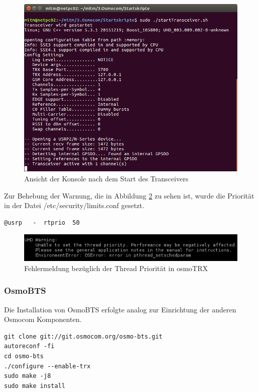 \begin{figure}[h] %
\centering
\includegraphics[width=15cm]{includes/Start_Transceiver}
\caption{Ansicht der Konsole nach dem Start des Transceivers}
\label{fig:Transceiver}
\end{figure}

Zur Behebung der Warnung, die in Abbildung \ref{fig:UHDWarnung} zu sehen ist, wurde die Priorität in der Datei /etc/security/limits.conf gesetzt.

\begin{lstlisting}
@usrp   -  rtprio  50
\end{lstlisting}

\begin{figure}[h] %
\centering
\includegraphics[width=15cm]{includes/uhd_usrp_warnung}
\caption{Fehlermeldung bezüglich der Thread Priorität in osmoTRX}
\label{fig:UHDWarnung}
\end{figure}

\subsubsection{OsmoBTS}
Die Installation von OsmoBTS erfolgte analog zur Einrichtung der anderen Osmocom Komponenten.

\begin{lstlisting}
git clone git://git.osmocom.org/osmo-bts.git
autoreconf -fi
cd osmo-bts
./configure --enable-trx
sudo make -j8
sudo make install
\end{lstlisting}

